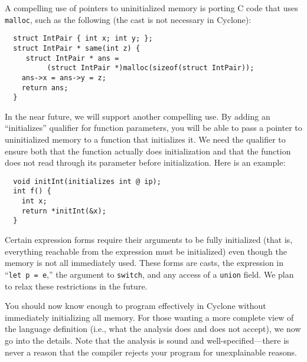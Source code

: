 A compelling use of pointers to uninitialized memory is porting C code
that uses \texttt{malloc}, such as the following (the cast is not
necessary in Cyclone):
\begin{verbatim}
  struct IntPair { int x; int y; };
  struct IntPair * same(int z) {
     struct IntPair * ans = 
          (struct IntPair *)malloc(sizeof(struct IntPair));
    ans->x = ans->y = z;
    return ans;
  }
\end{verbatim}

In the near future, we will support another compelling use.  By adding
an ``initializes'' qualifier for function parameters, you will be able
to pass a pointer to uninitialized memory to a function that
initializes it.  We need the qualifier to ensure both that the
function actually does initialization and that the function does not
read through its parameter before initialization.  Here is an example:
\begin{verbatim}
  void initInt(initializes int @ ip);
  int f() {
    int x;
    return *initInt(&x);
  }
\end{verbatim}

Certain expression forms require their arguments to be fully
initialized (that is, everything reachable from the expression must be
initialized) even though the memory is not all immediately used.
These forms are casts, the expression in ``\texttt{let p = e},'' the
argument to \texttt{switch}, and any access of a \texttt{union} field.  We
plan to relax these restrictions in the future.

You should now know enough to program effectively in Cyclone without
immediately initializing all memory.  For those wanting a more
complete view of the language definition (i.e., what the analysis does
and does not accept), we now go into the details.  Note that the
analysis is sound and well-specified---there is never a reason that
the compiler rejects your program for unexplainable reasons.

